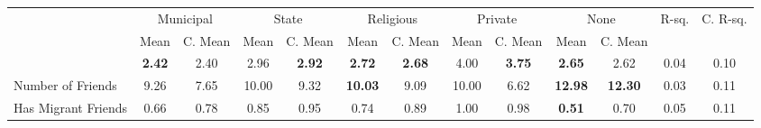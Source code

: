 \begin{tabular}{l c c c c c c c c c c c c}
\toprule
& \multicolumn{2}{c}{Municipal} & \multicolumn{2}{c}{State} & \multicolumn{2}{c}{Religious} & \multicolumn{2}{c}{Private} & \multicolumn{2}{c}{None} & R-sq. & C. R-sq. \\
& \scriptsize Mean & \scriptsize C. Mean & \scriptsize Mean & \scriptsize C. Mean & \scriptsize Mean & \scriptsize C. Mean & \scriptsize Mean & \scriptsize C. Mean & \scriptsize Mean & \scriptsize C. Mean & & \\
\midrule
& \textbf{     2.42} & 2.40 &      2.96 & \textbf{     2.92} & \textbf{     2.72} & \textbf{     2.68} &      4.00 & \textbf{     3.75} & \textbf{     2.65} & 2.62 &      0.04 &      0.10 \\
Number of Friends &      9.26 & 7.65 &     10.00 & 9.32 & \textbf{    10.03} & 9.09 &     10.00 & 6.62 & \textbf{    12.98} & \textbf{    12.30} &      0.03 &      0.11 \\
Has Migrant Friends &      0.66 & 0.78 &      0.85 & 0.95 &      0.74 & 0.89 &      1.00 & 0.98 & \textbf{     0.51} & 0.70 &      0.05 &      0.11 \\
\bottomrule
\end{tabular}
